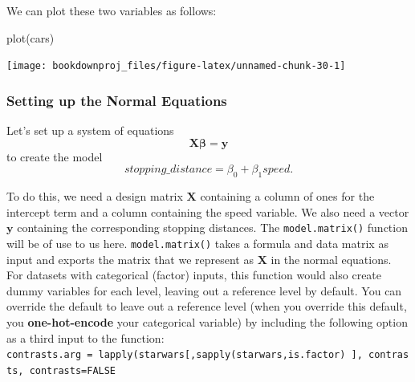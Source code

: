 \documentclass[
]{article}
\newenvironment{Shaded}{\begin{snugshade}}{\end{snugshade}}
\newcommand{\AttributeTok}[1]{\textcolor[rgb]{0.77,0.63,0.00}{#1}}
\newcommand{\CommentTok}[1]{\textcolor[rgb]{0.56,0.35,0.01}{\textit{#1}}}
\newcommand{\FunctionTok}[1]{\textcolor[rgb]{0.00,0.00,0.00}{#1}}
\newcommand{\NormalTok}[1]{#1}
\newcommand{\OtherTok}[1]{\textcolor[rgb]{0.56,0.35,0.01}{#1}}
\newcommand{\SpecialCharTok}[1]{\textcolor[rgb]{0.00,0.00,0.00}{#1}}
\theoremstyle{definition}
\theoremstyle{definition}
\theoremstyle{definition}
\theoremstyle{definition}
\theoremstyle{remark}
\begin{document}
We can plot these two variables as follows:

\begin{Shaded}
\begin{Highlighting}[]
\FunctionTok{plot}\NormalTok{(cars)}
\end{Highlighting}
\end{Shaded}

\begin{center}\texttt{[image: bookdownproj\_files/figure-latex/unnamed-chunk-30-1]} \end{center}

\hypertarget{setting-up-the-normal-equations}{%
\subsubsection{Setting up the Normal Equations}\label{setting-up-the-normal-equations}}

Let's set up a system of equations
\[\mathbf{X}\boldsymbol\beta=\mathbf{y}\]
to create the model
\[stopping\_distance=\beta_0+\beta_1speed.\]

To do this, we need a design matrix \(\mathbf{X}\) containing a column of ones for the intercept term and a column containing the speed variable. We also need a vector \(\mathbf{y}\) containing the corresponding stopping distances. The \texttt{model.matrix()} function will be of use to us here. \texttt{model.matrix()} takes a formula and data matrix as input and exports the matrix that we represent as \(\mathbf{X}\) in the normal equations. For datasets with categorical (factor) inputs, this function would also create dummy variables for each level, leaving out a reference level by default. You can override the default to leave out a reference level (when you override this default, you \textbf{one-hot-encode} your categorical variable) by including the following option as a third input to the function: \texttt{contrasts.arg\ =\ lapply(starwars{[},sapply(starwars,is.factor)\ {]},\ contrasts,\ contrasts=FALSE}

\begin{Shaded}
\end{Shaded}
\end{document}
